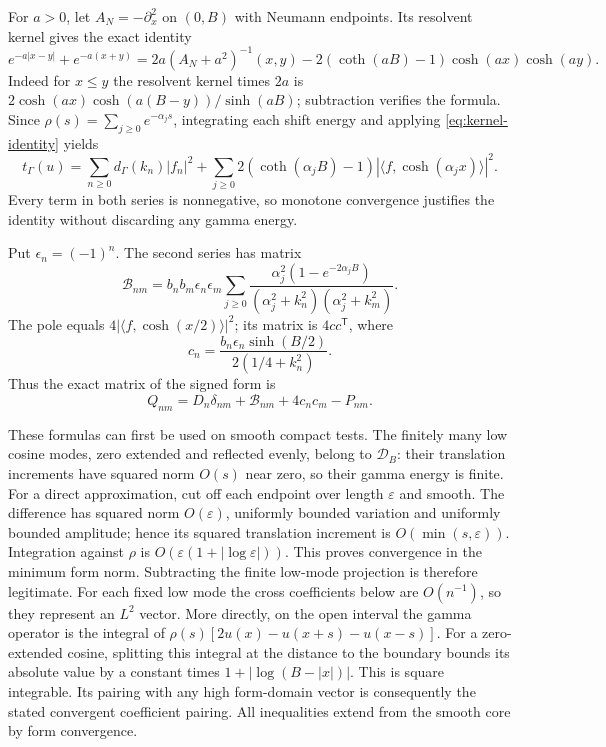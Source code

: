 \documentclass[11pt]{article}
\begin{document}
For $a>0$, let $A_N=-\partial_x^2$ on $(0,B)$ with Neumann endpoints.
Its resolvent kernel gives the exact identity
\begin{equation}\label{eq:kernel-identity}
 e^{-a|x-y|}+e^{-a(x+y)}
 =2a(A_N+a^2)^{-1}(x,y)
   -2(\coth(aB)-1)\cosh(ax)\cosh(ay).
\end{equation}
Indeed for $x\le y$ the resolvent kernel times $2a$ is
$2\cosh(ax)\cosh(a(B-y))/\sinh(aB)$; subtraction verifies the formula.
Since $\rho(s)=\sum_{j\ge0}e^{-\alpha_js}$, integrating each shift
energy and applying \eqref{eq:kernel-identity} yields
\begin{equation}\label{eq:gamma-positive-boundary}
 t_\Gamma(u)=\sum_{n\ge0}d_\Gamma(k_n)|f_n|^2
 +\sum_{j\ge0}2(\coth(\alpha_jB)-1)
       |\langle f,\cosh(\alpha_jx)\rangle|^2.
\end{equation}
Every term in both series is nonnegative, so monotone convergence
justifies the identity without discarding any gamma energy.

Put $\epsilon_n=(-1)^n$. The second series has matrix
\begin{equation}\label{eq:boundary-matrix}
 \mathcal B_{nm}=b_nb_m\epsilon_n\epsilon_m
 \sum_{j\ge0}\frac{\alpha_j^2(1-e^{-2\alpha_jB})}
 { (\alpha_j^2+k_n^2)(\alpha_j^2+k_m^2)}.
\end{equation}
The pole equals $4|\langle f,\cosh(x/2)\rangle|^2$; its matrix is
$4cc^{\mathsf T}$, where
\begin{equation}\label{eq:pole-vector}
 c_n=\frac{b_n\epsilon_n\sinh(B/2)}{2(1/4+k_n^2)}.
\end{equation}
Thus the exact matrix of the signed form is
\begin{equation}\label{eq:Q-neumann}
 Q_{nm}=D_n\delta_{nm}+\mathcal B_{nm}+4c_nc_m-P_{nm}.
\end{equation}

These formulas can first be used on smooth compact tests. The finitely
many low cosine modes, zero extended and reflected evenly, belong to
$\mathcal D_B$: their translation increments have squared norm $O(s)$
near zero, so their gamma energy is finite. For a direct approximation,
cut off each endpoint over length $\varepsilon$ and smooth. The difference
has squared norm $O(\varepsilon)$, uniformly bounded variation and
uniformly bounded amplitude; hence its squared translation increment is
$O(\min(s,\varepsilon))$. Integration against $\rho$ is
$O(\varepsilon(1+|\log\varepsilon|))$. This proves convergence in the
minimum form norm. Subtracting the finite low-mode projection is therefore
legitimate. For each fixed low mode the cross coefficients below are
$O(n^{-1})$, so they represent an $L^2$ vector. More directly, on the
open interval the gamma operator is the integral of
$\rho(s)[2u(x)-u(x+s)-u(x-s)]$. For a zero-extended cosine, splitting
this integral at the distance to the boundary bounds its absolute value
by a constant times $1+|\log(B-|x|)|$. This is square integrable. Its pairing with any high
form-domain vector is consequently the stated convergent coefficient
pairing. All inequalities extend from the smooth core by form convergence.
\end{document}
